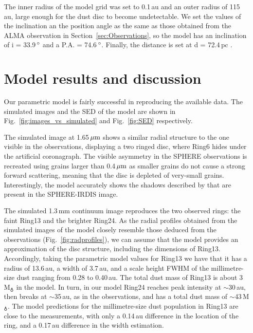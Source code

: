 \documentclass[letters,usenatbib,times]{mnras}
\begin{document}
The inner radius of the model grid was set to 0.1\,au and an outer radius of 115\,au, large enough for the dust disc to become undetectable. We set the values of the inclination an the position angle as the same as those obtained from the ALMA observation in Section~\ref{sec:Observations}, so the model has an inclination of i = 33.9\,$\hbox{$^\circ$}$ and a P.A. = 74.6\,$\hbox{$^\circ$}$. Finally, the distance is set at d = 72.4\,pc \citep{Gaia}.

\section{Model results and discussion} \label{sec:results}

Our parametric model is fairly successful in reproducing the available data. The simulated images and the SED of the model are shown in Fig.~\ref{fig:images_vs_simulated} and Fig.~\ref{fig:SED} respectively.

The simulated image at 1.65\,$\hbox{$\mu$m}$ shows a similar radial structure to the one visible in the observations, displaying a two ringed disc, where Ring6 hides under the artificial coronagraph. The visible asymmetry in the SPHERE observations is recreated using grains larger than 0.4\,$\hbox{$\mu$m}$ as smaller grains do not cause a strong forward scattering, meaning that the disc is depleted of very-small grains. Interestingly, the model accurately shows the shadows described by \citet{dOrazi} that are present in the SPHERE-IRDIS image.

The simulated 1.3\,mm continuum image reproduces the two observed rings: the faint Ring13 and the brighter Ring24. As the radial profiles obtained from the simulated images of the model closely resemble those deduced from the observations (Fig.~\ref{fig:radprofiles}), we can assume that the model provides an approximation of the disc structure, including the dimensions of Ring13. Accordingly, taking the parametric model values for Ring13 we have that it has a radius of 13.6\,au, a width of 3.7\,au, and a scale height FWHM of the millimetre-size dust ranging from 0.28 to 0.40\,au. The total dust mass of Ring13 is about 3\,M$_{\earth}$ in the model. In turn, in our model Ring24 reaches peak intensity at $\sim$30\,au, then breaks at $\sim$35\,au, as in the observations, and has a total dust mass of $\sim$43\,M$_{\earth}$. The model predictions for the millimetre-size dust population in Ring13 are close to the measurements, with only a 0.14\,au difference in the location of the ring, and a 0.17\,au difference in the width estimation.
\end{document}
